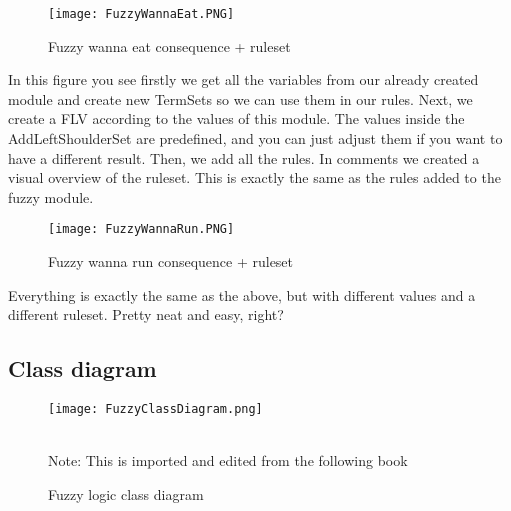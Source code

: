 \begin{figure}[ht]
    \begin{center}
        \texttt{[image: FuzzyWannaEat.PNG]}
    \end{center}
    \caption{Fuzzy wanna eat consequence + ruleset}
    \label{fig:FuzzyWannaEat}
\end{figure}
In this figure you see firstly we get all the variables from our already created module and create new TermSets so we can use them in our rules.
Next, we create a FLV according to the values of this module.
The values inside the AddLeftShoulderSet are predefined, and you can just adjust them if you want to have a different result.
Then, we add all the rules.
In comments we created a visual overview of the ruleset.
This is exactly the same as the rules added to the fuzzy module.
\newpage
\begin{figure}[ht]
    \begin{center}
        \texttt{[image: FuzzyWannaRun.PNG]}
    \end{center}
    \caption{Fuzzy wanna run consequence + ruleset}
    \label{fig:FuzzyWannaRun}
\end{figure}
Everything is exactly the same as the above, but with different values and a different ruleset.
Pretty neat and easy, right?
\newpage
\subsection{Class diagram}
\begin{figure}[ht]
    \begin{center}
        \texttt{[image: FuzzyClassDiagram.png]}
    \end{center}
    \begin{center}
    \caption{Fuzzy logic class diagram}
    \\Note: This is imported and edited from the following book \cite{pgaie} %
    \end{center}
    \label{fig:FuzzyClassDiagram}
\end{figure}
\newpage
\newpage
